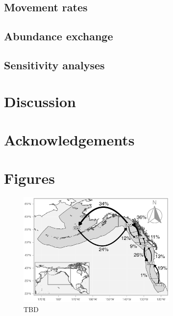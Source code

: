 \documentclass{article}
\begin{document}
\subsection{Movement rates}

\subsection{Abundance exchange}

\subsection{Sensitivity analyses}

\section{Discussion}

\section{Acknowledgements}

\section{Figures}

\begin{figure}[htb]
    \centering
    \includegraphics[width = 0.7\textwidth]{map-regions-6-network}
    \caption{TBD}
    \label{fig:map-network-regions-6}
\end{figure}

\end{document}
